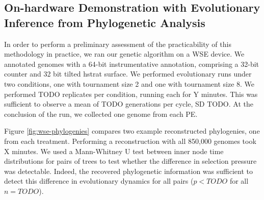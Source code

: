 
\subsection{On-hardware Demonstration with Evolutionary Inference from Phylogenetic Analysis}



In order to perform a preliminary assessment of the practicability of this methodology in practice, we ran our genetic algorithm on a WSE device.
We annotated genomes with a 64-bit instrumentative annotation, comprising a 32-bit counter and 32 bit tilted hstrat surface.
We performed evolutionary runs under two conditions, one with tournament size 2 and one with tournament size 8.
We performed TODO replicates per condition, running each for Y minutes.
This was sufficient to observe a mean of TODO generations per cycle, SD TODO.
At the conclusion of the run, we collected one genome from each PE.

Figure \ref{fig:wse-phylogenies} compares two example reconstructed phylogenies, one from each treatment.
Performing a reconstruction with all 850,000 genomes took X minutes.
We used a Mann-Whitney U test between inner node time distributions for pairs of trees to test whether the difference in selection pressure was detectable.
Indeed, the recovered phylogenetic information was sufficient to detect this difference in evolutionary dynamics for all pairs ($p < TODO$ for all $n=TODO$).
